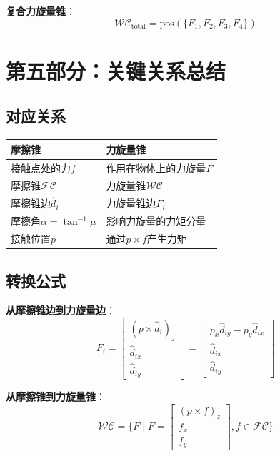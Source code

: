 \documentclass[12pt,a4paper]{article}
\begin{document}
\textbf{复合力旋量锥}：
\begin{equation}
\mathcal{WC}_{\text{total}} = \text{pos}(\{F_1, F_2, F_3, F_4\})
\end{equation}

\section{第五部分：关键关系总结}

\subsection{对应关系}

\begin{center}
\begin{tabular}{|l|l|}
\hline
\textbf{摩擦锥} & \textbf{力旋量锥} \\
\hline
接触点处的力$f$ & 作用在物体上的力旋量$F$ \\
\hline
摩擦锥$\mathcal{FC}$ & 力旋量锥$\mathcal{WC}$ \\
\hline
摩擦锥边$\hat{d}_i$ & 力旋量锥边$F_i$ \\
\hline
摩擦角$\alpha = \tan^{-1}\mu$ & 影响力旋量的力矩分量 \\
\hline
接触位置$p$ & 通过$p \times f$产生力矩 \\
\hline
\end{tabular}
\end{center}

\subsection{转换公式}

\textbf{从摩擦锥边到力旋量边}：
\begin{equation}
F_i = \begin{bmatrix} (p \times \hat{d}_i)_z \\ \hat{d}_{ix} \\ \hat{d}_{iy} \end{bmatrix} = \begin{bmatrix} p_x \hat{d}_{iy} - p_y \hat{d}_{ix} \\ \hat{d}_{ix} \\ \hat{d}_{iy} \end{bmatrix}
\end{equation}

\textbf{从摩擦锥到力旋量锥}：
\begin{equation}
\mathcal{WC} = \{F \mid F = \begin{bmatrix} (p \times f)_z \\ f_x \\ f_y \end{bmatrix}, f \in \mathcal{FC}\}
\end{equation}
\end{document}
